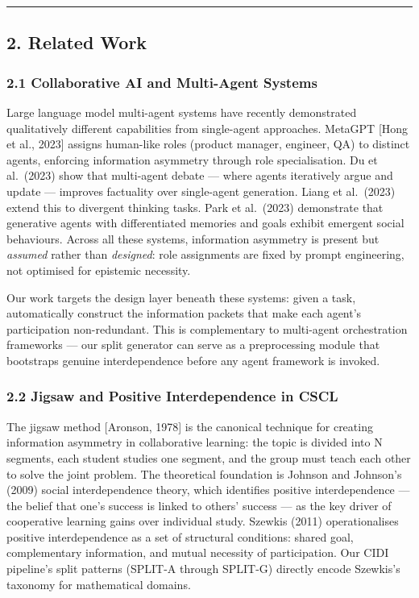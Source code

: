 \documentclass[
  11pt,
]{article}
\begin{document}
\begin{center}\rule{0.5\linewidth}{0.5pt}\end{center}

\subsection{2. Related Work}\label{related-work}

\subsubsection{2.1 Collaborative AI and Multi-Agent
Systems}\label{collaborative-ai-and-multi-agent-systems}

Large language model multi-agent systems have recently demonstrated
qualitatively different capabilities from single-agent approaches.
MetaGPT {[}Hong et al., 2023{]} assigns human-like roles (product
manager, engineer, QA) to distinct agents, enforcing information
asymmetry through role specialisation. Du et al.~(2023) show that
multi-agent debate --- where agents iteratively argue and update ---
improves factuality over single-agent generation. Liang et al.~(2023)
extend this to divergent thinking tasks. Park et al.~(2023) demonstrate
that generative agents with differentiated memories and goals exhibit
emergent social behaviours. Across all these systems, information
asymmetry is present but \emph{assumed} rather than \emph{designed}:
role assignments are fixed by prompt engineering, not optimised for
epistemic necessity.

Our work targets the design layer beneath these systems: given a task,
automatically construct the information packets that make each agent's
participation non-redundant. This is complementary to multi-agent
orchestration frameworks --- our split generator can serve as a
preprocessing module that bootstraps genuine interdependence before any
agent framework is invoked.

\subsubsection{2.2 Jigsaw and Positive Interdependence in
CSCL}\label{jigsaw-and-positive-interdependence-in-cscl}

The jigsaw method [Aronson, 1978] is the canonical technique
for creating information asymmetry in collaborative learning: the topic
is divided into N segments, each student studies one segment, and the
group must teach each other to solve the joint problem. The theoretical
foundation is Johnson and Johnson's (2009) social interdependence
theory, which identifies positive interdependence --- the belief that
one's success is linked to others' success --- as the key driver of
cooperative learning gains over individual study. Szewkis (2011)
operationalises positive interdependence as a set of structural
conditions: shared goal, complementary information, and mutual necessity
of participation. Our CIDI pipeline's split patterns (SPLIT-A through
SPLIT-G) directly encode Szewkis's taxonomy for mathematical domains.
\end{document}
